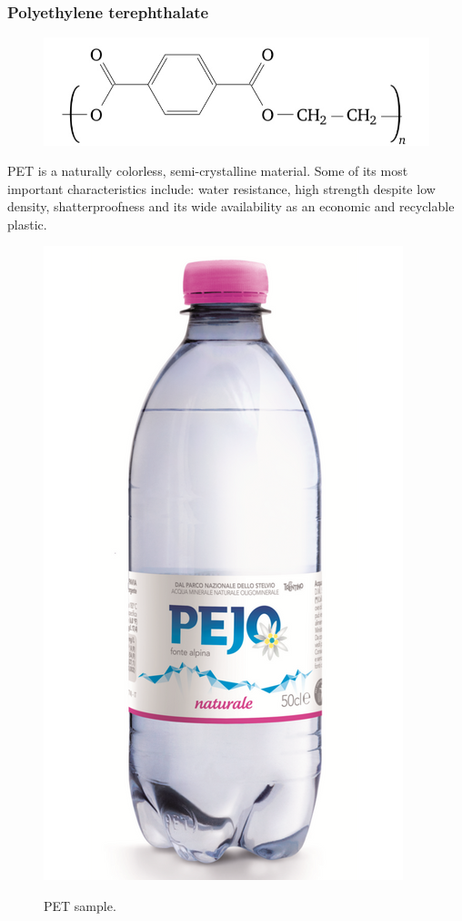 \documentclass[a4paper, 11pt]{article}
\begin{document}
\newpage

\subsubsection{Polyethylene terephthalate}

\begin{figure}[htp]
	\centering
	{\includegraphics[scale=0.45]{pet_chem}}
	\captionsetup{justification=centering}
	\label{fig:PE}
\end{figure}

PET is a naturally colorless, semi-crystalline material. Some of its most important characteristics include: water resistance, high strength despite low density, shatterproofness and its wide availability as an economic and recyclable plastic.

\begin{figure}[htp]
	\centering
	{\includegraphics[scale=0.15]{PET}}
	\captionsetup{justification=centering}
	\caption{PET sample.}
	\label{fig:PET}
\end{figure}
\end{document}
